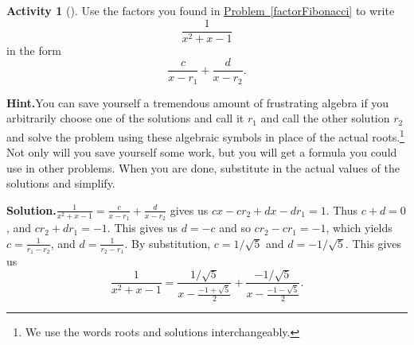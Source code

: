 \documentclass[10pt,]{book}
\theoremstyle{plain}
\theoremstyle{definition}
\newtheorem{activity}[project]{Activity}
\numberwithin{equation}{chapter}
\begin{document}
\begin{activity}[]\label{fractionFibonacci}
Use the factors you found in \hyperref[factorFibonacci]{Problem~\ref{factorFibonacci}} to write%
\begin{equation*}
\frac{1}{x^2+x-1}
\end{equation*}
in the form%
\begin{equation*}
\frac{c}{x-r_1} + \frac{d}{x-r_2}.
\end{equation*}
%
\par\medskip\noindent%
\textbf{Hint.}\quad You can save yourself a tremendous amount of frustrating algebra if you arbitrarily choose one of the solutions and call it \(r_1\) and call the other solution \(r_2\) and solve the problem using these algebraic symbols in place of the actual roots.\footnote{We use the words roots and solutions interchangeably.\label{fn-14}} Not only will you save yourself some work, but you will get a formula you could use in other problems. When you are done, substitute in the actual values of the solutions and simplify.%
\par\medskip\noindent%
\textbf{Solution.}\quad \(\frac{1}{x^2+x-1}=\frac{c}{x-r_1}+\frac{d}{x-r_2}\) gives us \(cx-cr_2+dx-dr_1=1\). Thus \(c+d=0\), and \(cr_2+dr_1 =-1\). This gives us \(d=-c\) and so \(cr_2-cr_1=-1\), which yields \(c=\frac{1}{r_1-r_2}\), and \(d=\frac{1}{r_2-r_1}\). By substitution, \(c=1/\sqrt{5}\) and \(d=-1/\sqrt{5}\). This gives us%
\begin{equation*}
\frac{1}{x^2+x-1} = \frac{1/\sqrt{5}}{x-\frac{-1+\sqrt{5}}{2}}
+ \frac{-1/\sqrt{5}}{x- \frac{-1-\sqrt{5}}{2}}.
\end{equation*}
%
\end{activity}
\end{document}
